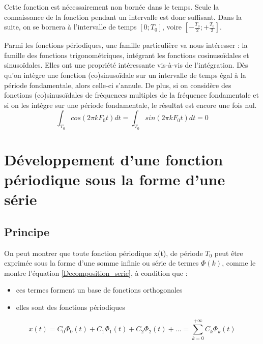 	Cette fonction est nécessairement non bornée dans le temps. Seule la connaissance de la fonction pendant un intervalle est donc suffisant. Dans la suite, on se bornera à l'intervalle de temps $[0;T_{0}]$, voire $[-\frac{T_{0}}{2};+\frac{T_{0}}{2}]$.
	
	Parmi les fonctions périodiques, une famille particulière va nous intéresser : la famille des fonctions trigonométriques, intégrant les fonctions cosinusoïdales et sinusoïdales. Elles ont une propriété intéressante vis-à-vis de l'intégration. Dès qu'on intègre une fonction (co)sinusoïdale sur un intervalle de temps égal à la période fondamentale, alors celle-ci s'annule. De plus, si on considère des fonctions (co)sinusoïdales de fréquences multiples de la fréquence fondamentale et si on les intègre sur une période fondamentale, le résultat est encore une fois nul.
	\begin{equation}\label{key}
	\int_{T_{0}}cos(2\pi kF_{0}t)dt=\int_{T_{0}}sin(2\pi kF_{0}t)dt=0
	\end{equation}
	
	
	\section{Développement d'une fonction périodique sous la forme d'une série}
	
	\subsection{Principe}
	On peut montrer que toute fonction périodique x(t), de période $T_{0}$ peut être exprimée sous la forme d'une somme infinie ou série de termes $\Phi(k)$, comme le montre l'équation \ref{Decomposition_serie}, à condition que :
	\begin{itemize}
		\item ces termes forment un base de fonctions orthogonales
		\item elles sont des fonctions périodiques
	\end{itemize} 

	\begin{equation}\label{Decomposition_serie}
	x(t)=C_{0}\Phi_{0}(t)+C_{1}\Phi_{1}(t)+C_{2}\Phi_{2}(t)+...=\sum_{k=0}^{+\infty}C_{k}\Phi_{k}(t)
	\end{equation}


